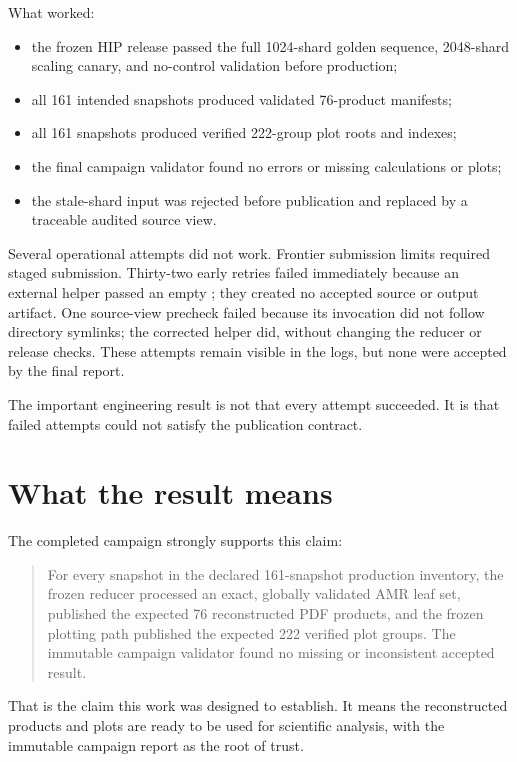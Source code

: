 \documentclass[11pt]{article}
\begin{document}
What worked:
\begin{itemize}
  \item the frozen HIP release passed the full 1024-shard golden sequence,
        2048-shard scaling canary, and no-control validation before production;
  \item all 161 intended snapshots produced validated 76-product manifests;
  \item all 161 snapshots produced verified 222-group plot roots and indexes;
  \item the final campaign validator found no errors or missing calculations
        or plots;
  \item the stale-shard input was rejected before publication and replaced by
        a traceable audited source view.
\end{itemize}

Several operational attempts did not work. Frontier submission limits required
staged submission. Thirty-two early retries failed immediately because an
external helper passed an empty ; they created no
accepted source or output artifact. One source-view precheck failed because
its  invocation did not follow directory symlinks; the corrected
helper did, without changing the reducer or release checks. These attempts
remain visible in the logs, but none were accepted by the final report.

The important engineering result is not that every attempt succeeded. It is
that failed attempts could not satisfy the publication contract.

\section{What the result means}

The completed campaign strongly supports this claim:

\begin{quote}
For every snapshot in the declared 161-snapshot production inventory, the
frozen reducer processed an exact, globally validated AMR leaf set, published
the expected 76 reconstructed PDF products, and the frozen plotting path
published the expected 222 verified plot groups. The immutable campaign
validator found no missing or inconsistent accepted result.
\end{quote}

That is the claim this work was designed to establish. It means the
reconstructed products and plots are ready to be used for scientific analysis,
with the immutable campaign report as the root of trust.
\end{document}
